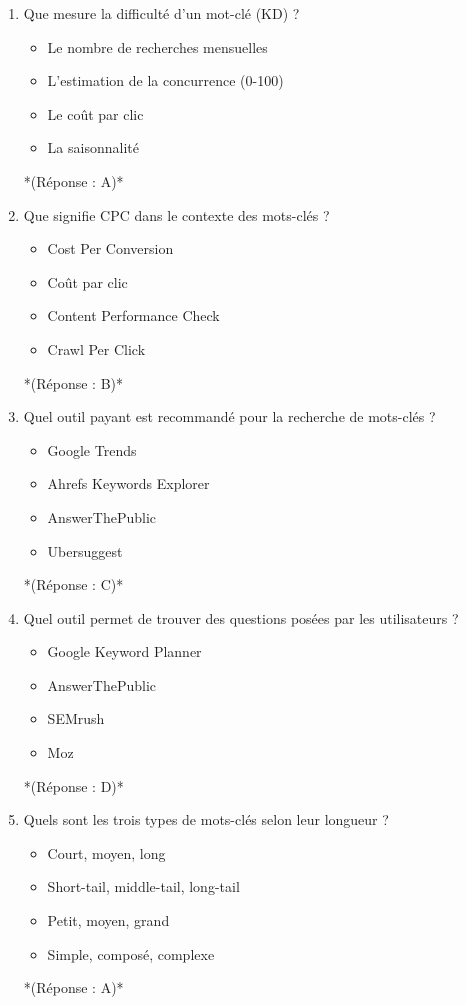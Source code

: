 \documentclass[12pt,a4paper,twoside]{report}
\begin{document}
\begin{enumerate}
\item Que mesure la difficulté d'un mot-clé (KD) ?
\begin{itemize}
\item[A)] Le nombre de recherches mensuelles
\item[B)] L'estimation de la concurrence (0-100)
\item[C)] Le coût par clic
\item[D)] La saisonnalité
\end{itemize}
*(Réponse : A)*

\item Que signifie CPC dans le contexte des mots-clés ?
\begin{itemize}
\item[A)] Cost Per Conversion
\item[B)] Coût par clic
\item[C)] Content Performance Check
\item[D)] Crawl Per Click
\end{itemize}
*(Réponse : B)*

\item Quel outil payant est recommandé pour la recherche de mots-clés ?
\begin{itemize}
\item[A)] Google Trends
\item[B)] Ahrefs Keywords Explorer
\item[C)] AnswerThePublic
\item[D)] Ubersuggest
\end{itemize}
*(Réponse : C)*

\item Quel outil permet de trouver des questions posées par les utilisateurs ?
\begin{itemize}
\item[A)] Google Keyword Planner
\item[B)] AnswerThePublic
\item[C)] SEMrush
\item[D)] Moz
\end{itemize}
*(Réponse : D)*

\item Quels sont les trois types de mots-clés selon leur longueur ?
\begin{itemize}
\item[A)] Court, moyen, long
\item[B)] Short-tail, middle-tail, long-tail
\item[C)] Petit, moyen, grand
\item[D)] Simple, composé, complexe
\end{itemize}
*(Réponse : A)*


\end{enumerate}
\end{document}
